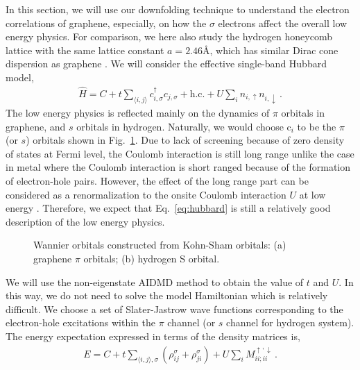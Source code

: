 \documentclass[prl,12pt,onecolumn,nofootinbib,notitlepage,english,superscriptaddress]{revtex4-1}
\begin{document}
In this section, we will use our downfolding technique to understand the electron correlations of graphene, especially, on how the $\sigma$ electrons affect the overall low energy physics. For comparison, we here also study the hydrogen honeycomb lattice with the same lattice constant $a=2.46$\AA, which has similar Dirac cone dispersion as graphene \cite{Zheng2016}.  We will consider the effective single-band Hubbard model, 
\begin{eqnarray}\label{eq:hubbard}
\hat{H} = C + t\sum_{\langle i,j\rangle}c_{i, \sigma}^\dagger c_{j, \sigma} + \text{h.c.} + U\sum_{i}n_{i, \uparrow}n_{i, \downarrow}\,. 
\end{eqnarray}
The low energy physics is reflected mainly on the dynamics of $\pi$ orbitals in  graphene, and $s$ orbitals in hydrogen. Naturally, we would choose c$_i$ to be the $\pi$ (or $s$) orbitals shown in Fig.~\ref{fig:wan}. Due to lack of screening because of zero density of states at Fermi level, the Coulomb interaction is still long range unlike the case in metal where the Coulomb interaction is short ranged because of the formation of electron-hole pairs. However, the effect of the long range part can be considered as a renormalization to the onsite Coulomb interaction $U$ at low energy \cite{Schuler2013, Changlani2015}. Therefore, we expect that Eq.~\eqref{eq:hubbard} is still a relatively good description of the low energy physics. 

\begin{figure}[hbt]
  \centering  
       \caption{Wannier orbitals constructed from Kohn-Sham orbitals: (a) graphene $\pi$ orbitals; (b) hydrogen S orbital. }
\label{fig:wan}
\end{figure}

We will use the non-eigenstate AIDMD method to obtain the value of $t$ and $U$. In this way, we do not need to solve the model Hamiltonian which is relatively difficult. We choose a set of Slater-Jastrow wave functions corresponding to the electron-hole excitations within the $\pi$ channel (or $s$ channel for hydrogen system). The energy expectation expressed in terms of the density matrices is, 
\begin{eqnarray}\label{eq:en}
E = C + t\sum_{\langle i, j\rangle, \sigma}( \rho_{ij}^\sigma + \rho_{ji}^\sigma) + U \sum_{i}M_{ii;ii}^{\uparrow,\downarrow}\,.
\end{eqnarray}
\end{document}
